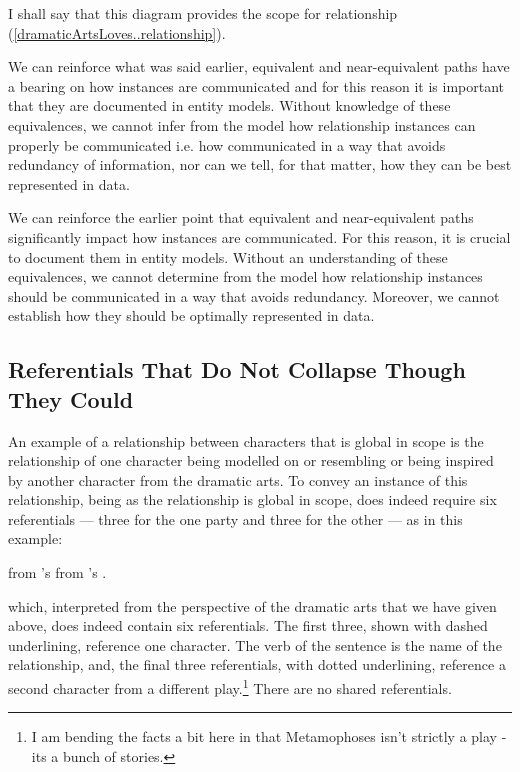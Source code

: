 I shall say that this diagram provides the scope for relationship (\ref{dramaticArtsLoves..relationship}). 

We can reinforce what was said earlier, equivalent and near-equivalent paths
have  a bearing on how instances are communicated and for this reason it is important 
that they are documented in entity models. Without knowledge of these equivalences,
we cannot infer from the model how relationship instances can properly be communicated 
i.e. how communicated in a way that avoids redundancy of information,
nor can we tell, for that matter, how they can be best represented in data.  

We can reinforce the earlier point that equivalent and near-equivalent paths significantly impact how instances are communicated. For this reason, it is crucial to document them in entity models. Without an understanding of these equivalences, we cannot determine from the model how relationship instances should be communicated in a way that avoids redundancy. Moreover, we cannot establish how they should be optimally represented in data.


 \subsection{Referentials That Do Not Collapse Though They Could}
 An example of a relationship between characters that is global in scope 
 is the relationship of one character being modelled on or resembling or being inspired 
 by another character from the dramatic arts.
 To convey an instance of this relationship, being as the relationship is global in scope,  does indeed require
 six referentials --- three for the one party and three for the other --- as in this example:
\begin{erquote}
\parbox{9.0cm}{\linespread{1.3}\normalsize
{} from 's 
            from 's .}
\end{erquote}
which, interpreted from the perspective of the dramatic arts that we have given above, does indeed contain six referentials. 
The first three, shown with dashed underlining, reference one character.
The verb of the sentence is the name of the relationship, and, 
the final three referentials, with dotted underlining, 
reference a second character from a different play.\footnote{I am bending the facts a bit here 
in that Metamophoses isn't strictly a play - its a bunch of stories.} 
There are no shared referentials.









 
